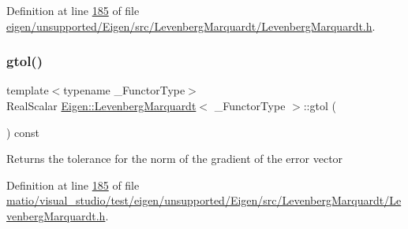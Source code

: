 Definition at line \hyperlink{eigen_2unsupported_2_eigen_2src_2_levenberg_marquardt_2_levenberg_marquardt_8h_source_l00185}{185} of file \hyperlink{eigen_2unsupported_2_eigen_2src_2_levenberg_marquardt_2_levenberg_marquardt_8h_source}{eigen/unsupported/\+Eigen/src/\+Levenberg\+Marquardt/\+Levenberg\+Marquardt.\+h}.

\mbox{\label{class_eigen_1_1_levenberg_marquardt_a18597c537ec7d492ee6d43788178e458}} 
\subsubsection{\texorpdfstring{gtol()}{gtol()}\hspace{0.1cm}{\footnotesize\ttfamily [2/2]}}
{\footnotesize\ttfamily template$<$typename \+\_\+\+Functor\+Type$>$ \\
Real\+Scalar \hyperlink{class_eigen_1_1_levenberg_marquardt}{Eigen\+::\+Levenberg\+Marquardt}$<$ \+\_\+\+Functor\+Type $>$\+::gtol (\begin{DoxyParamCaption}{ }\end{DoxyParamCaption}) const\hspace{0.3cm}{\ttfamily [inline]}}

\begin{DoxyReturn}{Returns}
the tolerance for the norm of the gradient of the error vector 
\end{DoxyReturn}


Definition at line \hyperlink{matio_2visual__studio_2test_2eigen_2unsupported_2_eigen_2src_2_levenberg_marquardt_2_levenberg_marquardt_8h_source_l00185}{185} of file \hyperlink{matio_2visual__studio_2test_2eigen_2unsupported_2_eigen_2src_2_levenberg_marquardt_2_levenberg_marquardt_8h_source}{matio/visual\+\_\+studio/test/eigen/unsupported/\+Eigen/src/\+Levenberg\+Marquardt/\+Levenberg\+Marquardt.\+h}.

\mbox{\label{class_eigen_1_1_levenberg_marquardt_ae65bdccd2487989ae9b25f9c2e9dfab9}} 
